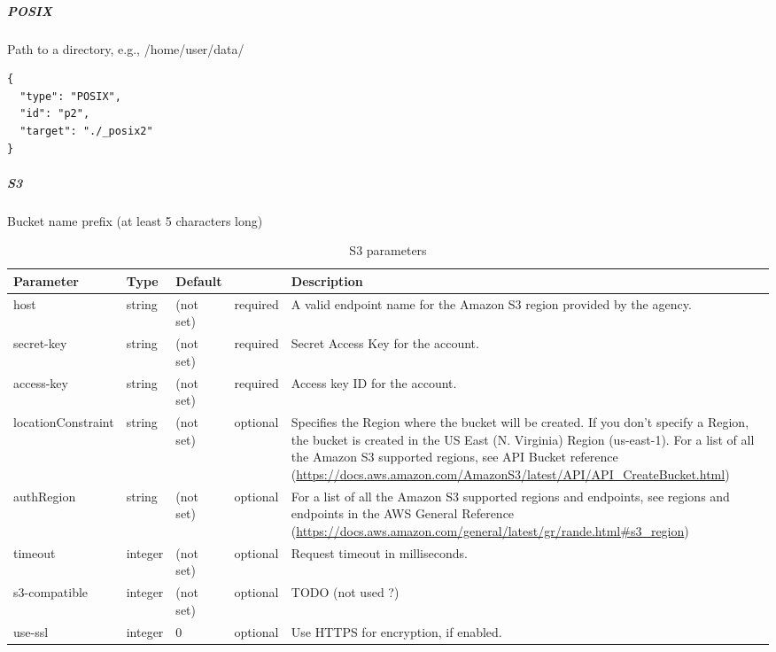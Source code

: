 \subparagraph{POSIX}

Path to a directory, e.g., /home/user/data/

\begin{lstlisting}
{
  "type": "POSIX",
  "id": "p2",
  "target": "./_posix2"
}
\end{lstlisting}

\subparagraph{S3}
Bucket name prefix (at least 5 characters long)


\begin{preserve}
\begin{table}[!h]
  \begin{center}
    \begin{scriptsize}
    \begin{tabularx}{\textwidth}{llllX}
      Parameter              & Type    & Default    &          & Description \\
      \hline
      host                   & string  & (not set)  & required & A valid endpoint name for the Amazon S3 region provided by the agency. \\
      secret-key             & string  & (not set)  & required & Secret Access Key for the account. \\
      access-key             & string  & (not set)  & required & Access key ID for the account. \\
      locationConstraint     & string  & (not set)  & optional & Specifies the Region where the bucket will be created. If you don't specify a Region, the bucket is created in the US East (N. Virginia) Region (us-east-1). For a list of all the Amazon S3 supported regions, see API Bucket reference (\url{https://docs.aws.amazon.com/AmazonS3/latest/API/API_CreateBucket.html}) \\
      authRegion             & string  & (not set)  & optional & For a list of all the Amazon S3 supported regions and endpoints, see regions and endpoints in the AWS General Reference (\url{https://docs.aws.amazon.com/general/latest/gr/rande.html\#s3_region}) \\
      timeout                & integer & (not set)  & optional & Request timeout in milliseconds. \\
      s3-compatible          & integer & (not set)  & optional & TODO (not used ?) \\
      use-ssl                & integer & 0          & optional & Use HTTPS for encryption, if enabled. \\
    \end{tabularx}
  \end{scriptsize}
  \end{center}
  \caption{S3 parameters}%
  \label{tab:s3_params}
\end{table}
\end{preserve}

